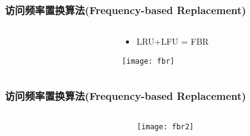 \begin{frame}[plain]
	\frametitle{访问频率置换算法(Frequency-based Replacement)}
	\begin{columns}
		\begin{column}{.0\textwidth}
			\centering
		\end{column}
		
		\begin{column}{1.0\textwidth}
			
			\begin{itemize}
				\item LRU+LFU = FBR

			\end{itemize}
			
			\texttt{[image: fbr]}
		\end{column}
		
	\end{columns}
\end{frame}


\begin{frame}[plain]
	\frametitle{访问频率置换算法(Frequency-based Replacement)}
	\begin{columns}
		\begin{column}{.0\textwidth}
			\centering
		\end{column}
		
		\begin{column}{1.0\textwidth}
			
%				
			
			\texttt{[image: fbr2]}
		\end{column}
		
		
	\end{columns}
\end{frame}



